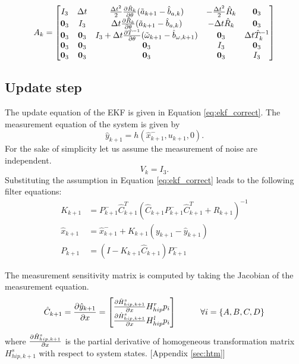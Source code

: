 \begin{equation}
    A_k = \begin{bmatrix}
    I_3 &\Delta t &\frac{\Delta t^2}{2} \frac{\partial {\hat{R}_k}}{\partial {\theta}}(\tilde{a}_{k+1} - \hat{b}_{a,k} ) &-\frac{\Delta t^2}{2} \hat{R}_k &\textbf{0}_3 \\
    \textbf{0}_3 &I_3  &\Delta t \frac{\partial {\hat{R}_k}}{\partial {\theta}}(\tilde{a}_{k+1} - \hat{b}_{a,k} ) &-\Delta t\hat{R}_k &\textbf{0}_3\\
    \textbf{0}_3  &\textbf{0}_3 &I_3 + \Delta t \frac{\partial {\hat{T}^{-1}}}{\partial {\theta}}(\tilde{\omega}_{k+1} - \hat{b}_{\omega,k+1}) &\textbf{0}_3 &\Delta t \hat{T}_k^{-1}\\
    \textbf{0}_3  &\textbf{0}_3  &\textbf{0}_3  &I_3 &\textbf{0}_3 \\
    \textbf{0}_3  &\textbf{0}_3  &\textbf{0}_3  &\textbf{0}_3 &I_3
    \end{bmatrix}
\end{equation}

\subsection{Update step}
The update equation of the EKF is given in Equation \ref{eq:ekf_correct}. The measurement equation of the system is given by $$\hat{y}_{k+1} = h(\hat{x}_{k+1}^-,u_{k+1},0).$$For the sake of simplicity let us assume the measurement of noise are independent. $$V_k = I_3.$$ Substituting the assumption in Equation \ref{eq:ekf_correct} leads to the following filter equations:
\begin{equation}
\label{eq:imu_correct}
\begin{split}
K_{k+1} &= P_{k+1}^-\hat{C}_{k+1}^{T}(\hat{C}_{k+1}P_{k+1}^-\hat{C}_{k+1}^{T} + R_{k+1})^{-1}\\
\hat{x}_{k+1} &= \hat{x}_{k+1}^- + K_{k+1}(y_{k+1}-\hat{y}_{k+1})\\
P_{k+1} &= (I- K_{k+1}\hat{C}_{k+1})P_{k+1}^-
\end{split}
\end{equation}

The measurement sensitivity matrix is computed by taking the Jacobian of the measurement equation.
\begin{equation}
        \hat{C}_{k+1} = \frac{\partial {\hat{y}_{k+1}}}{\partial {x}} = 
	\begin{bmatrix}		        
        \frac{\partial {\hat{H}^{s}_{hip,k+1}}}{\partial {x}} H_{hip}^r p_i\\
		\frac{\partial {\hat{H}^{s}_{hip,k+1}}}{\partial {x}} H_{hip}^l p_i\\
    \end{bmatrix}
         \hspace{1cm} \forall i=\{A,B,C,D\} 
\end{equation}
where $\frac{\partial {\hat{H}^s_{hip,k+1}}}{\partial {x}}$ is the partial derivative of homogeneous transformation matrix $H_{hip,k+1}^s$ with respect to system states. [Appendix \ref{sec:htm}]


